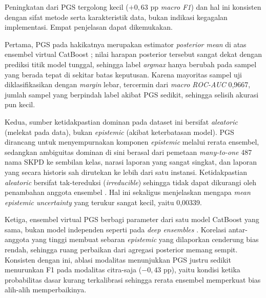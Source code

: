 Peningkatan dari PGS tergolong kecil ($+0{,}63$ pp \textit{macro F1}) dan hal ini konsisten dengan sifat metode serta karakteristik data, bukan indikasi kegagalan implementasi. Empat penjelasan dapat dikemukakan.

Pertama, PGS pada hakikatnya merupakan estimator \textit{posterior mean} di atas ensembel virtual CatBoost \citep{ustimenkoCatBoostUncertainty2023}; nilai harapan posterior tersebut sangat dekat dengan prediksi titik model tunggal, sehingga label \textit{argmax} hanya berubah pada sampel yang berada tepat di sekitar batas keputusan. Karena mayoritas sampel uji diklasifikasikan dengan \textit{margin} lebar, tercermin dari \textit{macro ROC-AUC} 0,9667, jumlah sampel yang berpindah label akibat PGS sedikit, sehingga selisih akurasi pun kecil.

Kedua, sumber ketidakpastian dominan pada dataset ini bersifat \textit{aleatoric} (melekat pada data), bukan \textit{epistemic} (akibat keterbatasan model). PGS dirancang untuk menyempurnakan komponen \textit{epistemic} melalui rerata ensembel, sedangkan ambiguitas dominan di sini berasal dari pemetaan \textit{many-to-one} 487 nama SKPD ke sembilan kelas, narasi laporan yang sangat singkat, dan laporan yang secara historis sah dirutekan ke lebih dari satu instansi. Ketidakpastian \textit{aleatoric} bersifat tak-tereduksi (\textit{irreducible}) sehingga tidak dapat dikurangi oleh penambahan anggota ensembel \citep{kendallGal2017,huellermeierWaegeman2021}. Hal ini sekaligus menjelaskan mengapa \textit{mean epistemic uncertainty} yang terukur sangat kecil, yaitu 0,00339.

Ketiga, ensembel virtual PGS berbagi parameter dari satu model CatBoost yang sama, bukan model independen seperti pada \textit{deep ensembles} \citep{lakshminarayananDeepEnsembles2017}. Korelasi antar-anggota yang tinggi membuat sebaran \textit{epistemic} yang dilaporkan cenderung bias rendah, sehingga ruang perbaikan dari agregasi posterior memang sempit. Konsisten dengan ini, ablasi modalitas menunjukkan PGS justru sedikit menurunkan F1 pada modalitas citra-saja ($-0{,}43$ pp), yaitu kondisi ketika probabilitas dasar kurang terkalibrasi sehingga rerata ensembel memperkuat bias alih-alih memperbaikinya.

